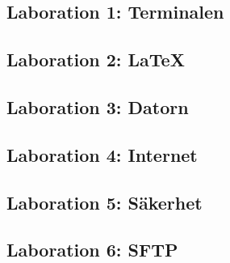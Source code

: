 \documentclass[a4paper,logo]{miunart}
\begin{document}
\subsection*{Laboration 1: Terminalen}
\noindent



\subsection*{Laboration 2: \LaTeX}
\noindent



\subsection*{Laboration 3: Datorn}
\noindent



\subsection*{Laboration 4: Internet}
\noindent



\subsection*{Laboration 5: Säkerhet}
\noindent



\subsection*{Laboration 6: SFTP}
\noindent




\end{document}
